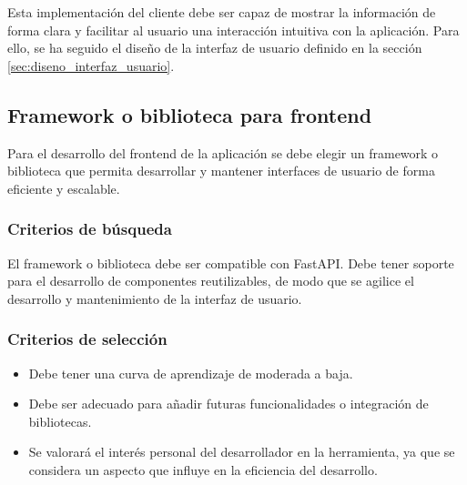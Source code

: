 Esta implementación del cliente debe ser capaz de mostrar la información de forma clara y facilitar al usuario una interacción intuitiva con la aplicación. Para ello, se ha seguido el diseño de la interfaz de usuario definido en la sección \ref{sec:diseno_interfaz_usuario}.


\subsection{Framework o biblioteca para frontend}
Para el desarrollo del frontend de la aplicación se debe elegir un framework o biblioteca que permita desarrollar y mantener interfaces de usuario de forma eficiente y escalable. 

\subsubsection{Criterios de búsqueda}
El framework o biblioteca debe ser compatible con FastAPI. Debe tener soporte para el desarrollo de componentes reutilizables, de modo que se agilice el desarrollo y mantenimiento de la interfaz de usuario. 

\subsubsection{Criterios de selección}
\begin{itemize}
    \item Debe tener una curva de aprendizaje de moderada a baja.
    \item Debe ser adecuado para añadir futuras funcionalidades o integración de bibliotecas.
    \item Se valorará el interés personal del desarrollador en la herramienta, ya que se considera un aspecto que influye en la eficiencia del desarrollo.
\end{itemize}

